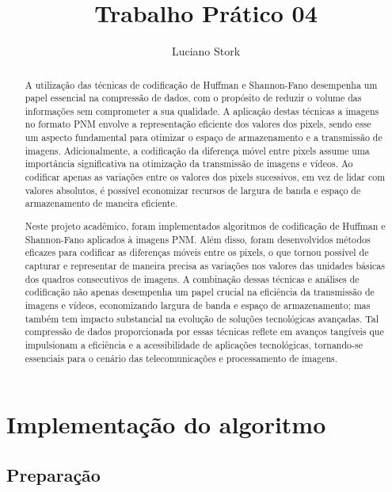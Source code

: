 \documentclass{article}
\title{Trabalho Prático 04}
\author{Luciano Stork}
\begin{document}
\maketitle

\begin{abstract}
A utilização das técnicas de codificação de Huffman e Shannon-Fano desempenha um papel essencial na compressão de dados, com o propósito de reduzir o volume das informações sem comprometer a sua qualidade. A aplicação destas técnicas a imagens no formato PNM envolve a representação eficiente dos valores dos pixels, sendo esse um aspecto fundamental para otimizar o espaço de armazenamento e a transmissão de imagens. Adicionalmente, a codificação da diferença móvel entre pixels assume uma importância significativa na otimização da transmissão de imagens e vídeos. Ao codificar apenas as variações entre os valores dos pixels sucessivos, em vez de lidar com valores absolutos, é possível economizar recursos de largura de banda e espaço de armazenamento de maneira eficiente. 

Neste projeto acadêmico, foram implementados algoritmos de codificação de Huffman e Shannon-Fano aplicados à imagens PNM. Além disso, foram desenvolvidos métodos eficazes para codificar as diferenças móveis entre os pixels, o que tornou possível de capturar e representar de maneira precisa as variações nos valores das unidades básicas dos quadros consecutivos de imagens. A combinação dessas técnicas e análises de codificação não apenas desempenha um papel crucial na eficiência da transmissão de imagens e vídeos, 
 economizando largura de banda e espaço de armazenamento; mas também tem impacto substancial na evolução de soluções tecnológicas avançadas. Tal compressão de dados proporcionada por essas técnicas reflete em avanços tangíveis que impulsionam a eficiência e a acessibilidade de aplicações tecnológicas, tornando-se essenciais para o cenário das telecomunicações e processamento de imagens.

\end{abstract}

\section{Implementação do algoritmo}
\subsection{Preparação}
\end{document}
